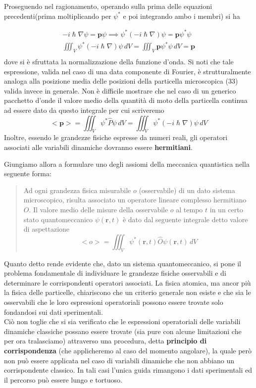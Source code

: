 Proseguendo nel ragionamento, operando sulla prima delle equazioni
precedenti(prima moltiplicando per \(\psi^{*}\) e poi integrando ambo i
membri) si ha

\begin{gather*}
	- i \hslash \nabla \psi = \bm{p} \psi \implies
	\psi^{*}(-i \hslash \nabla) \psi = \bm{p} \psi^{*}\psi\\
	\iiint_{V} \psi^{*}(-i \hslash \nabla) \psi \, dV = \iiint_{V} \bm{p} \psi^{*}\psi \, dV = \bm{p}\\
\end{gather*} dove si è sfruttata la normalizzazione della funzione d'onda.
Si noti
che tale espressione, valida nel caso di una data componente di Fourier,
è strutturalmente analoga alla posizione media delle posizioni della
particella microscopica (\(33\)) valida invece in generale.
Non è
difficile mostrare che nel caso di un generico pacchetto d'onde il
valore medio della quantità di moto della particella continua ad essere
dato da questo integrale per cui scriveremo \[
	<\bm{p}> = \iiint_{V} \psi^{*}\hat{P}\psi \, dV = \iiint_{V} \psi^{*}(- i \hslash \nabla )\psi \, dV
\] Inoltre, essendo le grandezze fisiche espresse da numeri reali, gli
operatori associati alle variabili dinamiche dovranno essere
\textbf{hermitiani}.

Giungiamo allora a formulare uno degli assiomi della meccanica
quantistica nella seguente forma:

\begin{quote}
	Ad ogni grandezza fisica misurabile \(o\) (osservabile) di un dato
	sistema microscopico, risulta associato un operatore lineare complesso
	hermitiano \(O\).
	Il valore medio delle misure della osservabile \(o\)
	al tempo \(t\) in un certo stato quantomeccanico \(\psi(\bm{r},t)\) è
	dato dal seguente integrale detto valore di aspettazione \[
		\boxed{<o> = \iiint_{V} \psi^{*}(\bm{r},t)\hat{O}\psi(\bm{r},t) \, dV}
	\]
\end{quote}

Quanto detto rende evidente che, dato un sistema quantomeccanico, si
pone il problema fondamentale di individuare le grandezze fisiche
osservabili e di determinare le corrispondenti operatori associati.
La
fisica atomica, ma ancor più la fisica delle particelle, chiariscono che
un criterio generale non esiste e che sia le osservabili che le loro
espressioni operatoriali possono essere trovate solo fondandosi sui dati
sperimentali.\\
Ciò non toglie che si sia verificato che le espressioni operatoriali
delle variabili dinamiche classiche possano essere trovate (sia pure con
alcune limitazioni che per ora tralasciamo) attraverso una procedura,
detta \textbf{principio di corrispondenza} (che applicheremo al caso del
momento angolare), la quale però non può essere applicata nel caso di
variabili dinamiche che non abbiano un corrispondente classico.
In tali
casi l'unica guida rimangono i dati sperimentali ed il percorso può
essere lungo e tortuoso.

